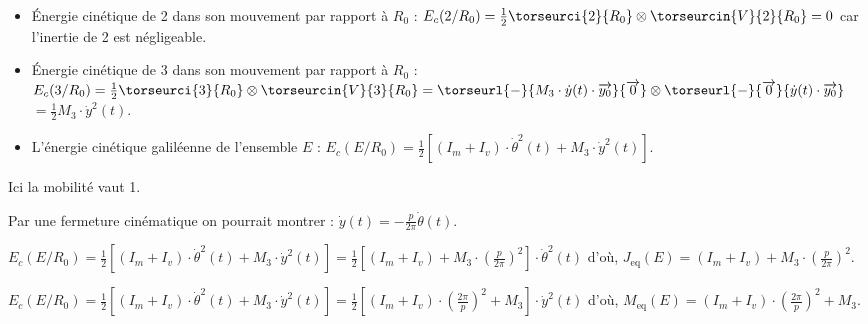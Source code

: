 \begin{multicols}{2}
\begin{corrige}
\begin{itemize}
\item Énergie cinétique de 2 dans son mouvement par rapport à $R_0$ : $
E_c(2/R_0)=\frac{1}{2}\torseurci{2}{R_0}\otimes \torseurcin{V}{2}{R_0}
=0$
car l'inertie de 2 est négligeable.
 
\item Énergie cinétique de 3 dans son mouvement par rapport à $R_0$ :$
E_c(3/R_0)=\frac{1}{2}\torseurci{3}{R_0}\otimes \torseurcin{V}{3}{R_0}
=\torseurl{-}{M_3\cdot \dot{y}(t)\cdot \overrightarrow{y_0}}{\overrightarrow{0}}\otimes
 \torseurl{-}{\overrightarrow{0}}{\dot{y}(t)\cdot\overrightarrow{y_0}}$ $ =\frac{1}{2}M_3\cdot \dot{y}^2(t)$.
 
\item L'énergie cinétique galiléenne de l'ensemble $E$ :
$E_c(E/R_0)=\frac{1}{2}\left[\left(I_m+I_v\right)\cdot \dot{\theta}^2(t)+ M_3\cdot \dot{y}^2(t)\right]$.
\end{itemize}
\end{corrige}\else\fi




\ifprof\begin{corrige}
Ici la mobilité vaut 1.
\end{corrige}\else\fi


\ifprof\begin{corrige}
Par une fermeture cinématique on pourrait montrer : $
\dot{y}(t)=-\frac{p}{2\pi}\dot{\theta}(t).
$
\end{corrige}\else\fi


\ifprof\begin{corrige}
$E_c(E/R_0)=\frac{1}{2}\left[\left(I_m+I_v\right)\cdot \dot{\theta}^2(t)+ M_3\cdot \dot{y}^2(t)\right]
=\frac{1}{2}\left[\left(I_m+I_v\right)+ M_3\cdot \left(\frac{p}{2\pi}\right)^2\right]\cdot \dot{\theta}^2(t)$
d'où,
$
J_{\text{eq}}(E)=\left(I_m+I_v\right)+ M_3\cdot \left(\frac{p}{2\pi}\right)^2$. \end{corrige}\else\fi

\ifprof\begin{corrige}
$E_c(E/R_0)=\frac{1}{2}\left[\left(I_m+I_v\right)\cdot \dot{\theta}^2(t)+ M_3\cdot \dot{y}^2(t)\right]
=\frac{1}{2}\left[\left(I_m+I_v\right)\cdot \left(\frac{2\pi}{p}\right)^2+ M_3\right]\cdot \dot{y}^2(t)$
d'où,
$
M_{\text{eq}}(E)=\left(I_m+I_v\right)\cdot \left(\frac{2\pi}{p}\right)^2+ M_3
$.


\end{corrige}
\end{multicols}
